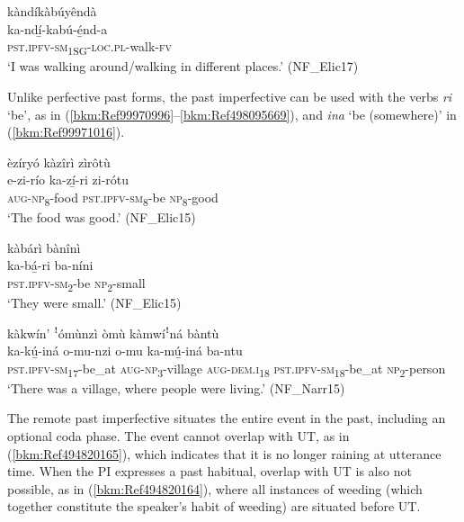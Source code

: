 \ea
\label{bkm:Ref99970977}
\glll kàndíkàbúyêndà\\
ka-ndí̲-kabú-é̲nd-a\\
\textsc{pst}.\textsc{ipfv}-\textsc{sm}\textsubscript{1SG}-\textsc{loc}.\textsc{pl}-walk-\textsc{fv}\\
\glt ‘I was walking around/walking in different places.’ (NF\_Elic17)
\z

Unlike perfective past forms, the past imperfective can be used with the verbs \textit{ri} ‘be’, as in (\ref{bkm:Ref99970996}--\ref{bkm:Ref498095669}), and \textit{ina} ‘be (somewhere)’ in (\ref{bkm:Ref99971016}).

\ea
\label{bkm:Ref99970996}
èzíryó kàzîrì zìrôtù\\
\gll e-zi-río    ka-zí̲-ri    zi-rótu\\
\textsc{aug}-\textsc{np}\textsubscript{8}-food  \textsc{pst}.\textsc{ipfv}-\textsc{sm}\textsubscript{8}-be  \textsc{np}\textsubscript{8}-good\\
\glt ‘The food was good.’ (NF\_Elic15)
\z

\ea
\label{bkm:Ref498095669}
kàbárì bànînì\\
\gll ka-bá̲-ri    ba-níni\\
\textsc{pst}.\textsc{ipfv}-\textsc{sm}\textsubscript{2}-be  \textsc{np}\textsubscript{2}-small\\
\glt ‘They were small.’ (NF\_Elic15)
\z

\ea
\label{bkm:Ref99971016}
kàkwín’ ꜝómùnzì òmù kàmwíꜝná bàntù\\
\gll ka-kú̲-iná    o-mu-nzi o-mu    ka-mú̲-iná      ba-ntu \\
\textsc{pst}.\textsc{ipfv}-\textsc{sm}\textsubscript{17}-be\_at  \textsc{aug}-\textsc{np}\textsubscript{3}-village
\textsc{aug}-\textsc{dem}.\textsc{i}\textsubscript{18}  \textsc{pst}.\textsc{ipfv}-\textsc{sm}\textsubscript{18}-be\_at    \textsc{np}\textsubscript{2}-person\\
\glt ‘There was a village, where people were living.’ (NF\_Narr15)
\z

The remote past imperfective situates the entire event in the past, including an optional coda phase. The event cannot overlap with UT, as in (\ref{bkm:Ref494820165}), which indicates that it is no longer raining at utterance time. When the PI expresses a past habitual, overlap with UT is also not possible, as in (\ref{bkm:Ref494820164}), where all instances of weeding (which together constitute the speaker’s habit of weeding) are situated before UT.

